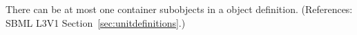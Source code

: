 There can be at most one \ListOfUnits container subobjects in a
\UnitDefinition object definition.  (References: SBML L3V1
Section~\ref{sec:unitdefinitions}.)
